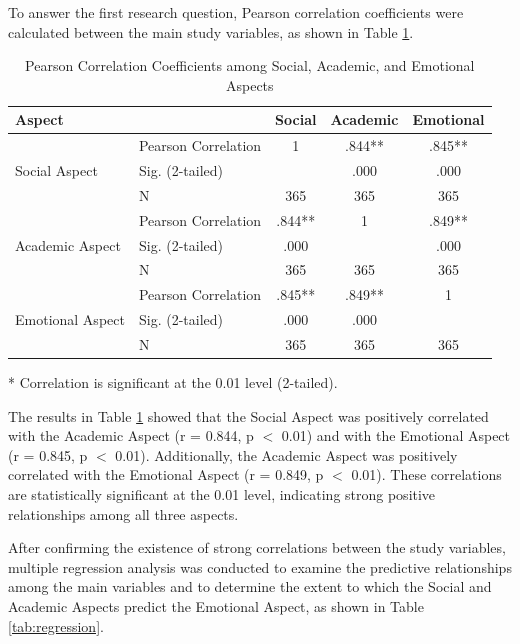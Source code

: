 \documentclass[10pt]{NSP1}
\begin{document}
	To answer the first research question, Pearson correlation coefficients were calculated between the main study variables, as shown in Table \ref{tab:pearson}.

	\begin{table}[H]
		\centering
		\caption{Pearson Correlation Coefficients among Social, Academic, and Emotional Aspects}
		\label{tab:pearson}
		\begin{tabular}{llccc}
			\toprule
			\textbf{Aspect} & & \textbf{Social} & \textbf{Academic} & \textbf{Emotional} \\
			\midrule
			\multirow{3}{*}{Social Aspect} & Pearson Correlation & 1 & .844** & .845** \\
			& Sig. (2-tailed) &  & .000 & .000 \\
			& N & 365 & 365 & 365 \\
			\midrule
			\multirow{3}{*}{Academic Aspect} & Pearson Correlation & .844** & 1 & .849** \\
			& Sig. (2-tailed) & .000 &  & .000 \\
			& N & 365 & 365 & 365 \\
			\midrule
			\multirow{3}{*}{Emotional Aspect} & Pearson Correlation & .845** & .849** & 1 \\
			& Sig. (2-tailed) & .000 & .000 & \\
			& N & 365 & 365 & 365 \\
			\bottomrule
		\end{tabular}

		\smallskip
		\footnotesize ** Correlation is significant at the 0.01 level (2-tailed).
	\end{table}

	The results in Table \ref{tab:pearson} showed that the Social Aspect was positively correlated with the Academic Aspect (r = 0.844, p $<$ 0.01) and with the Emotional Aspect (r = 0.845, p $<$ 0.01). Additionally, the Academic Aspect was positively correlated with the Emotional Aspect (r = 0.849, p $<$ 0.01). These correlations are statistically significant at the 0.01 level, indicating strong positive relationships among all three aspects.

	After confirming the existence of strong correlations between the study variables, multiple regression analysis was conducted to examine the predictive relationships among the main variables and to determine the extent to which the Social and Academic Aspects predict the Emotional Aspect, as shown in Table \ref{tab:regression}.
\end{document}
